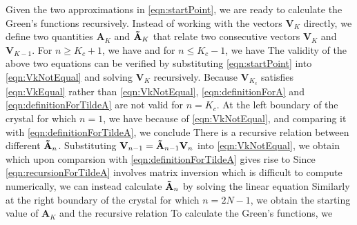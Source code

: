 Given the two approximations in \autoref{eqn:startPoint}, we are ready to calculate the Green's functions
 recursively. Instead of working with the vectors $\mathbf{V}_{K}$ directly, we define two quantities 
$\mathbf{A}_{K}$ and $\mathbf{\Tilde{A}}_{K} $ that relate
two consecutive vectors $\mathbf{V}_{K}$ and $\mathbf{V}_{K-1}$. For $n \ge K_c + 1$, we have
and for $n \le K_c - 1$, we have
The validity of the above two equations can be verified by substituting \autoref{eqn:startPoint} into
 \autoref{eqn:VkNotEqual} and solving $\mathbf{V}_{K}$ recursively. Because $\mathbf{V}_{K_c}$ satisfies 
\autoref{eqn:VkEqual} rather than \autoref{eqn:VkNotEqual}, \autoref{eqn:definitionForA} and 
\autoref{eqn:definitionForTildeA} are not valid for $n = K_c$. At the left boundary of the crystal for which $n=1$, we have
because of \autoref{eqn:VkNotEqual}, and comparing it with \autoref{eqn:definitionForTildeA}, we conclude 
There is a recursive relation between different $\mathbf{\Tilde{A}}_{n}$. Substituting 
$\mathbf{V}_{n-1} = \mathbf{\Tilde{A}}_{n-1} \mathbf{V}_{n} $ into \autoref{eqn:VkNotEqual}, we obtain
which upon comparsion with \autoref{eqn:definitionForTildeA} gives rise to
Since \autoref{eqn:recursionForTildeA} involves matrix inversion which is difficult to compute numerically, we can 
instead calculate
$\mathbf{\Tilde{A}}_{n}$ by solving the linear equation
Similarly at the right boundary of the crystal for which $n=2N-1$, we obtain the starting value of $\mathbf{A}_{K}$
and the recursive relation
To calculate the Green's functions, we  
